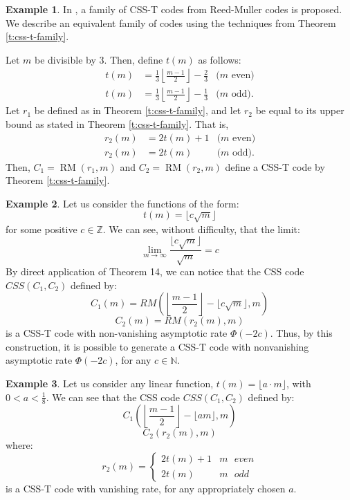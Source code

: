 \documentclass{amsart}
\theoremstyle{definition}
\newtheorem{example}{Example}
\newcommand{\N}{{\mathbb{N}}}
\newcommand{\floor}[1]{\left\lfloor#1\right\rfloor}
\DeclareMathOperator{\RM}{RM}
\begin{document}


\begin{example}  %
In \cite{CSS-T-it}, a family of CSS-T codes from Reed-Muller codes is proposed. We describe an equivalent family of codes using the techniques from Theorem \ref{t:css-t-family}.

Let $m$ be divisible by 3. Then, define $t(m)$ as follows:
    \begin{align*}
        t(m) &= \frac{1}{3}\floor{\frac{m-1}{2}} - \frac{2}{3}   &\textrm{($m$ even)} \\
        t(m) &= \frac{1}{3}\floor{\frac{m-1}{2}} - \frac{1}{3}   &\textrm{($m$ odd)}.
    \end{align*}
    Let $r_1$ be defined as in Theorem \ref{t:css-t-family}, and let $r_2$ be equal to its upper bound as stated in Theorem \ref{t:css-t-family}. That is, 
    \begin{align*}
        r_2(m) &= 2t(m) + 1  &\textrm{($m$ even)} \\
        r_2(m) &= 2t(m) &\textrm{($m$ odd)}.
    \end{align*}
    Then, $C_1=\RM(r_1, m)$ and $C_2=\RM(r_2, m)$ define a CSS-T code by Theorem \ref{t:css-t-family}.
\end{example}
\begin{example}
Let us consider the functions of the form:
$$t(m) = \lfloor c \sqrt{m} \rfloor$$
for some positive $c \in \mathbb{Z}$. We can see, without difficulty, that the limit:
$$\lim_{m \rightarrow \infty} \frac{\lfloor c \sqrt{m} \rfloor}{\sqrt{m}} = c$$
By direct application of Theorem 14, we can notice that the CSS code $CSS(C_1,C_2)$ defined by:
$$C_1(m) = RM \left( \left \lfloor \frac{m-1}{2} \right \rfloor - \lfloor c \sqrt{m} \rfloor, m \right)$$
$$C_2(m) = RM(r_2(m),m)$$
is a CSS-T code with non-vanishing asymptotic rate $\Phi(-2c)$. Thus, by this construction, it is possible to generate a CSS-T code with nonvanishing asymptotic rate $\Phi(-2c)$, for any $c \in \N$.{\\}
\end{example}
\begin{example}
Let us consider any linear function, $t(m) = \lfloor a \cdot m \rfloor$, with $0 < a < \frac{1}{8}$. We can see that the CSS code $CSS(C_1,C_2)$ defined by:
$$C_1 \left( \left \lfloor  \frac{m-1}{2} \right \rfloor - \lfloor a m  \rfloor ,m \right)$$
$$C_2 \left( r_2(m),m \right)$$
where:
$$r_2(m) = 
\begin{cases}
2 t(m) + 1  & m \, \, \, \, even \\
2 t(m) & m \, \, \, \, odd 
\end{cases}$$
is a CSS-T code with vanishing rate, for any appropriately chosen $a$.  
\end{example}
\end{document}
